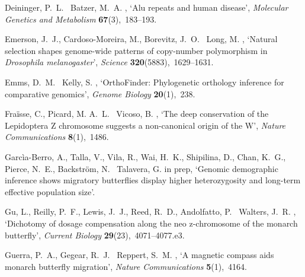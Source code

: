 \documentclass[twocolumn]{bmcart}%
\begin{document}
\begin{backmatter}
\begin{thebibliography}{xx}
Deininger, P.~L. \harvardand\ Batzer, M.~A.  \harvardyearright , `Alu repeats and human disease', {\em Molecular
  Genetics and Metabolism} {\bf 67}(3),~183--193.

Emerson, J.~J., Cardoso-Moreira, M., Borevitz, J.~O. \harvardand\ Long, M.
  \harvardyearleft 2008\harvardyearright , `Natural {{selection shapes
  genome-wide patterns}} of {{copy-number polymorphism}} in
  \textit{{{Drosophila}} melanogaster}', {\em Science} {\bf
  320}(5883),~1629--1631.

Emms, D.~M. \harvardand\ Kelly, S.  \harvardyearright ,
  `{{OrthoFinder}}: Phylogenetic orthology inference for comparative genomics',
  {\em Genome Biology} {\bf 20}(1),~238.

Fraïsse, C., Picard, M. A.~L. \harvardand\ Vicoso, B.  \harvardyearleft
  2017\harvardyearright , `The deep conservation of the {{Lepidoptera Z}}
  chromosome suggests a non-canonical origin of the {{W}}', {\em Nature
  Communications} {\bf 8}(1),~1486.

Garcìa-Berro, A., Talla, V., Vila, R., Wai, H.~K., Shipilina, D., Chan, K.~G.,
  Pierce, N.~E., Backström, N. \harvardand\ Talavera, G.  \harvardyearleft in
  prep\harvardyearright , `Genomic demographic inference shows migratory
  butterflies display higher heterozygosity and long-term effective population
  size'.

Gu, L., Reilly, P.~F., Lewis, J.~J., Reed, R.~D., Andolfatto, P. \harvardand\
  Walters, J.~R.  \harvardyearright , `Dichotomy of dosage
  compensation along the neo z-chromosome of the monarch butterfly', {\em
  Current Biology} {\bf 29}(23),~4071--4077.e3.

Guerra, P.~A., Gegear, R.~J. \harvardand\ Reppert, S.~M.  \harvardyearleft
  2014\harvardyearright , `A magnetic compass aids monarch butterfly
  migration', {\em Nature Communications} {\bf 5}(1),~4164.


\end{thebibliography}
\end{backmatter}
\end{document}
